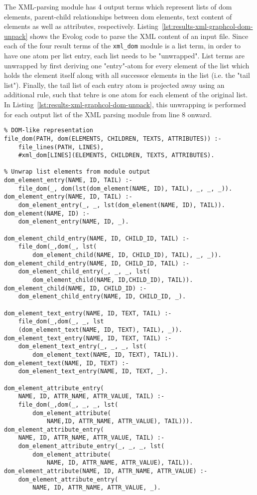 The XML-parsing module has 4 output terms which represent lists of \gls{dom} elements, parent-child relationships between \gls{dom} elements, text content of elements as well as attributes, respectively. Listing~\ref{lst:results-xml-graphcol-dom-unpack} shows the Evolog code to parse the XML content of an input file. Since each of the four result terms of the \texttt{xml\_dom} module is a list term, in order to have one atom per list entry, each list needs to be "unwrapped". List terms are unwrapped by first deriving one "entry"-atom for every element of the list which holds the element itself along with all successor elements in the list (i.e. the "tail list"). Finally, the tail list of each entry atom is projected away using an additional rule, such that tehre is one atom for each element of the original list. In Listing~\ref{lst:results-xml-graphcol-dom-unpack}, this unwrapping is performed for each output list of the XML parsing module from line 8 onward.

\begin{lstlisting}[style=asp-code, label={lst:results-xml-graphcol-dom-unpack}, caption={Parsing and consuming XML data in an Evolog program.}]
% Parse the string content of individual lines into a 
% DOM-like representation
file_dom(PATH, dom(ELEMENTS, CHILDREN, TEXTS, ATTRIBUTES)) :- 
    file_lines(PATH, LINES), 
    #xml_dom[LINES](ELEMENTS, CHILDREN, TEXTS, ATTRIBUTES).

% Unwrap list elements from module output
dom_element_entry(NAME, ID, TAIL) :- 
    file_dom(_, dom(lst(dom_element(NAME, ID), TAIL), _, _, _)).
dom_element_entry(NAME, ID, TAIL) :- 
    dom_element_entry(_, _, lst(dom_element(NAME, ID), TAIL)).
dom_element(NAME, ID) :- 
    dom_element_entry(NAME, ID, _).

dom_element_child_entry(NAME, ID, CHILD_ID, TAIL) :- 
    file_dom(_,dom(_, lst(
        dom_element_child(NAME, ID, CHILD_ID), TAIL), _, _)).
dom_element_child_entry(NAME, ID, CHILD_ID, TAIL) :- 
    dom_element_child_entry(_, _, _, lst(
        dom_element_child(NAME, ID,CHILD_ID), TAIL)).
dom_element_child(NAME, ID, CHILD_ID) :- 
    dom_element_child_entry(NAME, ID, CHILD_ID, _).

dom_element_text_entry(NAME, ID, TEXT, TAIL) :- 
    file_dom(_,dom(_, _, lst
    (dom_element_text(NAME, ID, TEXT), TAIL), _)).
dom_element_text_entry(NAME, ID, TEXT, TAIL) :- 
    dom_element_text_entry(_, _, _, lst(
        dom_element_text(NAME, ID, TEXT), TAIL)).
dom_element_text(NAME, ID, TEXT) :- 
    dom_element_text_entry(NAME, ID, TEXT, _).

dom_element_attribute_entry(
    NAME, ID, ATTR_NAME, ATTR_VALUE, TAIL) :- 
    file_dom(_,dom(_, _, _, lst(
        dom_element_attribute(
            NAME,ID, ATTR_NAME, ATTR_VALUE), TAIL))).
dom_element_attribute_entry(
    NAME, ID, ATTR_NAME, ATTR_VALUE, TAIL) :- 
    dom_element_attribute_entry(_, _, _, lst(
        dom_element_attribute(
            NAME, ID, ATTR_NAME, ATTR_VALUE), TAIL)).
dom_element_attribute(NAME, ID, ATTR_NAME, ATTR_VALUE) :- 
    dom_element_attribute_entry(
        NAME, ID, ATTR_NAME, ATTR_VALUE, _).   
\end{lstlisting}  

